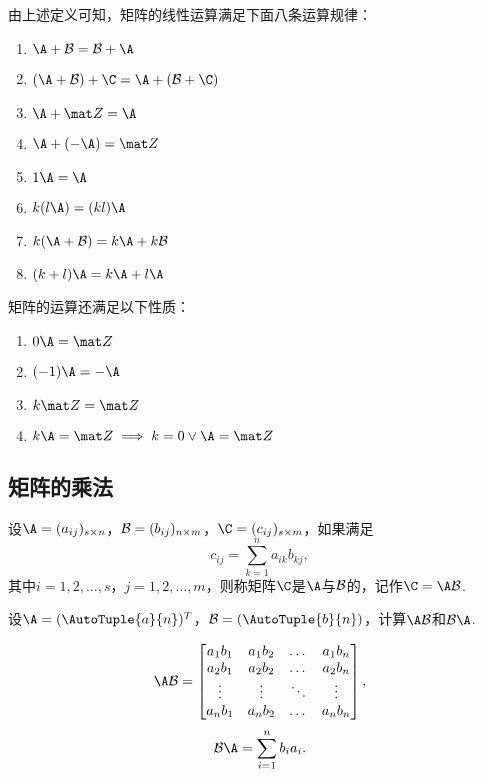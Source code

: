 \begin{theorem}
由上述定义可知，矩阵的线性运算满足下面八条运算规律：
\begin{enumerate}
\item \(\A + \B = \B + \A\)
\item \((\A + \B) + \C = \A + (\B + \C)\)
\item \(\A + \z = \A\)
\item \(\A + (-\A) = \z\)
\item \(1 \A = \A\)
\item \(k(l \A) = (kl) \A\)
\item \(k(\A + \B) = k\A + k\B\)
\item \((k+l)\A = k\A + l\A\)
\end{enumerate}
\end{theorem}

\begin{property}
矩阵的运算还满足以下性质：
\begin{enumerate}
\item \(0\A = \z\)
\item \((-1)\A = -\A\)
\item \(k\z = \z\)
\item \(k\A = \z \implies k = 0 \lor \A = \z\)
\end{enumerate}
\end{property}

\subsection{矩阵的乘法}
\begin{definition}
设\(\A = (a_{ij})_{s \times n}\)，\(\mathcal{B} = (b_{ij})_{n \times m}\)，\(\C = (c_{ij})_{s \times m}\)，如果满足\[
c_{ij} = \sum\limits_{k=1}^n {a_{ik} b_{kj}},
\]其中\(i=1,2,\dotsc,s\)，\(j=1,2,\dotsc,m\)，则称矩阵\(\C\)是\(\A\)与\(\mathcal{B}\)的，记作\(\C = \A \B\).
\end{definition}

\begin{example}
设\(\A = (\AutoTuple{a}{n})^T\)，\(\B = (\AutoTuple{b}{n})\)，计算\(\A\B\)和\(\B\A\).
\begin{solution}
\[
\A\B = \begin{bmatrix}
a_1 b_1 & a_1 b_2 & \dots & a_1 b_n \\
a_2 b_1 & a_2 b_2 & \dots & a_2 b_n \\
\vdots & \vdots & \ddots & \vdots \\
a_n b_1 & a_n b_2 & \dots & a_n b_n \\
\end{bmatrix},
\]\[
\B\A = \sum\limits_{i=1}^n{b_i a_i}.
\]
\end{solution}
\end{example}


